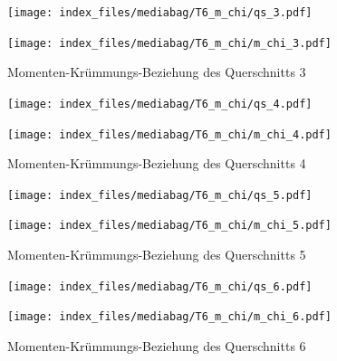 \documentclass[
  11pt,
  letterpaper,
]{scrreprt}
\begin{document}
\begin{figure}[H]

\begin{minipage}{0.50\linewidth}
\texttt{[image: index\_files/mediabag/T6\_m\_chi/qs\_3.pdf]}\end{minipage}%
%
\begin{minipage}{0.50\linewidth}
\texttt{[image: index\_files/mediabag/T6\_m\_chi/m\_chi\_3.pdf]}\end{minipage}%

\caption{\label{fig-mchi_anhang}Momenten-Krümmungs-Beziehung des
Querschnitts 3}

\end{figure}%

\begin{figure}[H]

\begin{minipage}{0.50\linewidth}
\texttt{[image: index\_files/mediabag/T6\_m\_chi/qs\_4.pdf]}\end{minipage}%
%
\begin{minipage}{0.50\linewidth}
\texttt{[image: index\_files/mediabag/T6\_m\_chi/m\_chi\_4.pdf]}\end{minipage}%

\caption{\label{fig-mchi_anhang}Momenten-Krümmungs-Beziehung des
Querschnitts 4}

\end{figure}%

\begin{figure}[H]

\begin{minipage}{0.50\linewidth}
\texttt{[image: index\_files/mediabag/T6\_m\_chi/qs\_5.pdf]}\end{minipage}%
%
\begin{minipage}{0.50\linewidth}
\texttt{[image: index\_files/mediabag/T6\_m\_chi/m\_chi\_5.pdf]}\end{minipage}%

\caption{\label{fig-mchi_anhang}Momenten-Krümmungs-Beziehung des
Querschnitts 5}

\end{figure}%

\begin{figure}[H]

\begin{minipage}{0.50\linewidth}
\texttt{[image: index\_files/mediabag/T6\_m\_chi/qs\_6.pdf]}\end{minipage}%
%
\begin{minipage}{0.50\linewidth}
\texttt{[image: index\_files/mediabag/T6\_m\_chi/m\_chi\_6.pdf]}\end{minipage}%

\caption{\label{fig-mchi_anhang}Momenten-Krümmungs-Beziehung des
Querschnitts 6}

\end{figure}%
\end{document}
